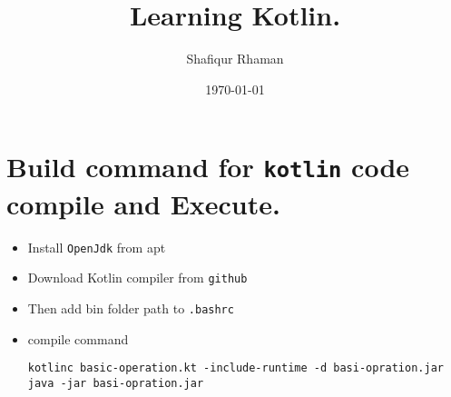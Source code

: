 \documentclass[11pt]{article}
\author{Shafiqur Rhaman}
\date{\today}
\title{Learning Kotlin.}
\begin{document}
\maketitle

\section*{Build command for \texttt{kotlin} code compile and Execute.}
\label{sec:org737dd8c}
\begin{itemize}
\item Install \texttt{OpenJdk} from apt
\item Download Kotlin compiler from \texttt{github}
\item Then add bin folder path to \texttt{.bashrc}
\item compile command
\begin{verbatim}
kotlinc basic-operation.kt -include-runtime -d basi-opration.jar
java -jar basi-opration.jar
\end{verbatim}
\end{itemize}
\end{document}
